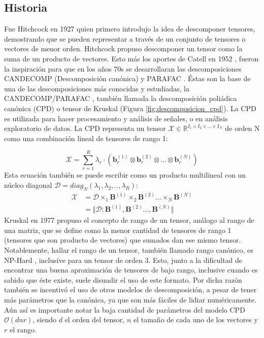 \documentclass[spanish]{article}
\theoremstyle{definition}
\theoremstyle{remark}
\numberwithin{equation}{section}
\numberwithin{equation}{section} %
\begin{document}
\subsection{Historia}
Fue Hitchcock en 1927 \cite{hitchcock1927expression,hitchcock1928multiple} quien primero introdujo la idea de descomponer tensores, demostrando que se pueden representar a través de un conjunto de tensores o vectores de menor orden. Hitchcock propuso descomponer un tensor como la suma de un producto de vectores. Esto más los aportes de Catell en 1952 \cite{cattell1952three}, fueron la inspiración para que en los años 70s se desarrollaran las descomposiciones CANDECOMP (Descomposición canónica) \cite{carroll1970analysis} y PARAFAC \cite{harshman1970foundations}. Éstas son la base de una de las descomposiciones más conocidas y estudiadas, la CANDECOMP/PARAFAC \cite{kiers2000towards}, también llamada la descomposición poliádica canónica (CPD) o tensor de Kruskal (Figura \ref{fig:descomposicion_cpd}). La CPD es utilizada para hacer procesamiento y análisis de señales, o en análisis exploratorio de datos. La CPD representa un tensor $\mathcal{X} \in \mathbb{R} ^{I_1 \times I_2 \times \ldots  \times I_N}$ de orden N como una combinación lineal de tensores de rango 1: \par
\begin{equation}
\label{eq_descomposicion_cpd}
\mathcal{X}= \sum_{r=1}^{R} \lambda_{r} \cdot (\boldsymbol{b}_{r}^{(1)} \otimes	 \boldsymbol{b}_{r}^{(2)} \otimes	  \ldots  \otimes	 \boldsymbol{b}_{r}^{(N)})     
\end{equation}
Esta ecuación también se puede escribir como un producto multilineal con un núcleo diagonal $\mathcal{D} = diag_N(\lambda_1,\lambda_2,..,\lambda_R)$: 
\begin{equation}
\label{eq_producto_multilineal_CPD}
 \begin{split} 
\mathcal{X}&
=\mathcal{D} \times_1 \boldsymbol{B}^{(1)} \times_2 \boldsymbol{B}^{(2)}  \ldots  \times_N \boldsymbol{B}^{(N)} \\
&=\Vert \mathcal{D};\boldsymbol{B}^{(1)},\boldsymbol{B}^{(2)} \ldots ,\boldsymbol{B}^{(N)} \Vert 
\end{split}
\end{equation}
Kruskal en 1977 \cite{kruskal1977three} propuso el concepto de rango de un tensor, análogo al rango de una matriz, que se define como la menor cantidad de tensores de rango 1 (tensores que son producto de vectores) que sumados dan ese mismo tensor. Notablemente, hallar el rango de un tensor, también llamado rango canónico, es NP-Hard \cite{haastad1990tensor}, inclusive para un tensor de orden 3. Esto, junto a la dificultad de encontrar una buena aproximación de tensores de bajo rango, inclusive cuando es sabido que éste existe, suele disuadir el uso de este formato. Por dicha razón también se incentivó el uso de otros modelos de descomposición, a pesar de tener más parámetros que la canónica, ya que son más fáciles de lidiar numéricamente. Aún así es importante notar la baja cantidad de parámetros del modelo CPD $\mathcal{O}(dnr)$, siendo $d$ el orden del tensor, $n$ el tamaño de cada uno de los vectores y $r$ el rango.  \par
\end{document}

